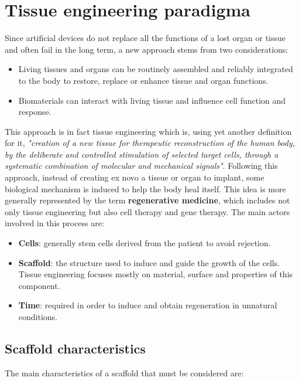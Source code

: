 \section{Tissue engineering paradigma}
Since artificial devices do not replace all the functions of a lost organ or tissue and often fail in the long term, a new approach stems from two considerations:

\begin{multicols}{2}
  \begin{itemize}
    \item Living tissues and organs can be routinely assembled and reliably integrated to the body to restore, replace or enhance tissue and organ functions.
    \item Biomaterials can interact with living tissue and influence cell function and response.
  \end{itemize}
\end{multicols}

This approach is in fact tissue engineering which is, using yet another definition for it, \textit{"creation of a new tissue for therapeutic reconstruction of the human body, by the deliberate and controlled stimulation of selected target cells, through a systematic combination of molecular and mechanical signals"}.
Following this approach, instead of creating ex novo a tissue or organ to implant, some biological mechanism is induced to help the body heal itself.
This idea is more generally represented by the term \textbf{regenerative medicine}, which includes not only tissue engineering but also cell therapy and gene therapy.
The main actors involved in this process are:

\begin{multicols}{2}
  \begin{itemize}
    \item \textbf{Cells}: generally stem cells derived from the patient to avoid rejection.
    \item \textbf{Scaffold}: the structure used to induce and guide the growth of the cells.
      Tissue engineering focuses mostly on material, surface and properties of this component.
    \item \textbf{Time}: required in order to induce and obtain regeneration in unnatural conditions.
  \end{itemize}
\end{multicols}

  \subsection{Scaffold characteristics}
  The main characteristics of a scaffold that must be considered are:

